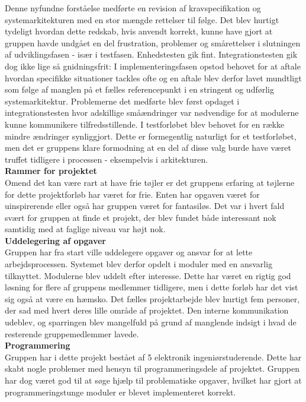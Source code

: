 Denne nyfundne forståelse medførte en revision af kravspecifikation og systemarkitekturen med en stor mængde rettelser til følge. Det blev hurtigt tydeligt hvordan dette redskab, hvis anvendt korrekt, kunne have gjort at gruppen havde undgået en del frustration, problemer og smårettelser i slutningen af udviklingsfasen - især i testfasen. Enhedstesten gik fint. Integrationstesten gik dog ikke lige så gnidningsfrit:
I implementeringsfasen opstod behovet for at aftale hvordan specifikke situationer tackles ofte og en aftale blev derfor lavet mundtligt som følge af manglen på et fælles referencepunkt i en stringent og udførlig systemarkitektur. Problemerne det medførte blev først opdaget i integrationstesten hvor adskillige småændringer var nødvendige for at modulerne kunne kommunikere tilfredsstillende. I testforløbet blev behovet for en række mindre ændringer synliggjort. Dette er formegentlig naturligt for et testforløbet, men det er gruppens klare formodning at en del af disse valg burde have været truffet tidligere i processen - eksempelvis i arkitekturen.\\

\textbf{Rammer for projektet}\\
Omend det kan være rart at have frie tøjler er det gruppens erfaring at tøjlerne for dette projektforløb har været for frie. Enten har opgaven været for uinspirerende eller også har gruppen været for fantasiløs. Det var i hvert fald svært for gruppen at finde et projekt, der blev fundet både interessant nok samtidig med at faglige niveau var højt nok.\\

\textbf{Uddelegering af opgaver}\\
Gruppen har fra start ville uddelegere opgaver og ansvar for at lette arbejdsprocessen. Systemet blev derfor opdelt i moduler med en ansvarlig tilknyttet. Modulerne blev uddelt efter interesse. Dette har været en rigtig god løsning for flere af gruppens medlemmer tidligere, men i dette forløb har det vist sig også at være en hæmsko. Det fælles projektarbejde blev hurtigt fem personer, der sad med hvert deres lille område af projektet. Den interne kommunikation udeblev, og sparringen blev mangelfuld på grund af manglende indsigt i hvad de resterende gruppemedlemmer lavede.\\

\textbf{Programmering}\\
Gruppen har i dette projekt bestået af 5 elektronik ingeniørstuderende. Dette har skabt nogle problemer med hensyn til programmeringsdele af projektet. Gruppen har dog været god til at søge hjælp til problematiske opgaver, hvilket har gjort at programmeringstunge moduler er blevet implementeret korrekt.\\

